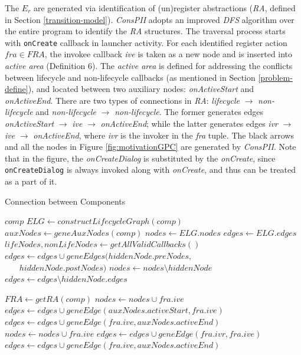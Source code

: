 The $E_{r}$ are generated via identification of (un)register abstractions (\textit{RA}, defined in Section \ref{transition-model}).
\textit{ConsPII} adopts an improved \textit{DFS} algorithm over the entire program to identify the \textit{RA} structures. The traversal process starts with \texttt{onCreate} callback in launcher activity. For each identified register action $fra\in FRA$, the invokee callback \textit{ive} is taken as a new node and is inserted into \textit{active area} (Definition 6). The \textit{active area} is defined for addressing the conflicts between lifecycle and non-lifecycle callbacks (as mentioned in Section \ref{problem-define}), and located between two auxiliary nodes: \textit{onActiveStart} and \textit{onActiveEnd}. There are two types of connections in \textit{RA}: \textit{lifecycle} $\rightarrow $ \textit{non-lifecycle} and \textit{non-lifecycle} $\rightarrow $ \textit{non-lifecycle}. The former generates edges \textit{onActiveStart} $\rightarrow $ \textit{ive} $\rightarrow $ \textit{onActiveEnd}; while the latter generates edges \textit{ivr} $\rightarrow $ \textit{ive} $\rightarrow $ \textit{onActiveEnd}, where \textit{ivr} is the invoker in the \textit{fra} tuple. The black arrows and all the nodes in Figure \ref{fig:motivationGPC} are generated by \textit{ConsPII}. Note that in the figure, the \textit{onCreateDialog} is substituted by the \textit{onCreate}, since \texttt{onCreateDialog} is always invoked along with \textit{onCreate}, and thus can be treated as a part of it.

\begin{algorithm}[!t]
\caption{Connection between Components}
\footnotesize
\begin{algorithmic}[1]
 {$comp$}
\State $ELG \leftarrow constructLifecycleGraph(comp)$
\State $ auxNodes \leftarrow geneAuxNodes(comp)$
\State $    nodes \leftarrow ELG.nodes$
\State $    edges \leftarrow ELG.edges$
\State $     lifeNodes, nonLifeNodes \leftarrow getAllValidCallbacks()$
\State $        edges \leftarrow edges \cup geneEdges(hiddenNode.preNodes,$\\
 $\ \ \ \ \ \ \ \        hiddenNode.postNodes)$
\State $        nodes \leftarrow nodes \setminus hiddenNode$
\State $        edges \leftarrow edges \setminus hiddenNode.edges$
\EndFor

\State $ FRA \leftarrow getRA(comp)$
\State $            nodes \leftarrow nodes \cup fra.ive$
\State $            edges \leftarrow edges \cup geneEdge(auxNodes.activeStart, fra.ive)$
\State $            edges \leftarrow edges \cup geneEdge(fra.ive, auxNodes.activeEnd )$
\State $  nodes \leftarrow nodes \cup fra.ive$
\State $  edges \leftarrow edges \cup geneEdge(fra.ivr, fra.ive)$
\State $  edges \leftarrow edges \cup geneEdge(fra.ive, auxNodes.activeEnd )$
\EndIf
\EndFor
\EndProcedure
\end{algorithmic}
\label{fig:alg1}
\end{algorithm}


